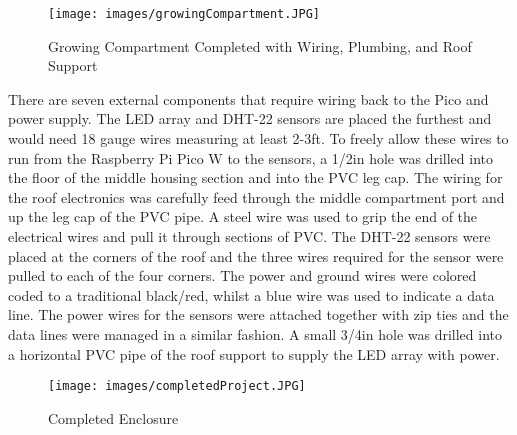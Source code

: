 \documentclass[12pt]{article} %
\begin{document}
\begin{figure}[H]
\centering
\texttt{[image: images/growingCompartment.JPG]}
\caption{Growing Compartment Completed with Wiring, Plumbing, and Roof Support}
\label{fig:growingCompartment}
\end{figure}

\pagebreak

\noindent There are seven external components that require wiring back to the Pico and power supply. The LED array and DHT-22 sensors are placed the furthest and would need 18 gauge wires measuring at least 2-3ft. To freely allow these wires to run from the Raspberry Pi Pico W to the sensors, a 1/2in hole was drilled into the floor of the middle housing section and into the PVC leg cap. The wiring for the roof electronics was carefully feed through the middle compartment port and up the leg cap of the PVC pipe. A steel wire was used to grip the end of the electrical wires and pull it through sections of PVC. The DHT-22 sensors were placed at the corners of the roof and the three wires required for the sensor were pulled to each of the four corners. The power and ground wires were colored coded to a traditional black/red, whilst a blue wire was used to indicate a data line. The power wires for the sensors were attached together with zip ties and the data lines were managed in a similar fashion. A small 3/4in hole was drilled into a horizontal PVC pipe of the roof support to supply the LED array with power. 

\begin{figure}[H]
\centering
\texttt{[image: images/completedProject.JPG]}
\caption{Completed Enclosure}
\label{fig:Completed Project}
\end{figure}

\pagebreak
\end{document}
